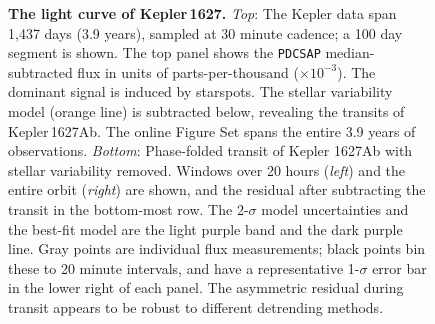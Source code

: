 \documentclass[12pt,modern,twocolumn,tighten]{aastex63}
\newcommand{\pn}{Kepler\,1627Ab} %
\begin{document}
\begin{figure}[tp]
\begin{center}
		\vspace{-0.2cm}	
	\end{center}
	\vspace{-0.7cm}
  \caption{ {\bf The light curve of Kepler\,1627.}
    {\it Top}: 
    The Kepler data span 1{,}437 days (3.9 years), sampled at
    30 minute cadence;  a 100 day segment is shown.  The
    top panel shows the \texttt{PDCSAP} median-subtracted flux in
    units of parts-per-thousand ($\times 10^{-3}$).  The dominant
    signal is induced by starspots.  The stellar
    variability model (orange line) is subtracted below, revealing the
    transits of \pn.  The
    online Figure Set spans the entire 3.9 years of observations.
    {\it Bottom}:
    Phase-folded transit of Kepler 1627Ab with stellar variability
    removed.  Windows over 20 hours ({\it left}) and the entire orbit
    ({\it right}) are shown, and the residual after subtracting the
    transit in the bottom-most row.  The 2-$\sigma$ model uncertainties
    and the best-fit model are the light purple band and the dark
    purple line.  Gray points are individual flux measurements; black
    points bin these to 20 minute intervals, and have a representative
    1-$\sigma$ error bar in the lower right of each panel.  The
    asymmetric residual during transit appears to be robust to
    different detrending methods.
    \label{fig:lc}
  }
\end{figure}
\end{document}
